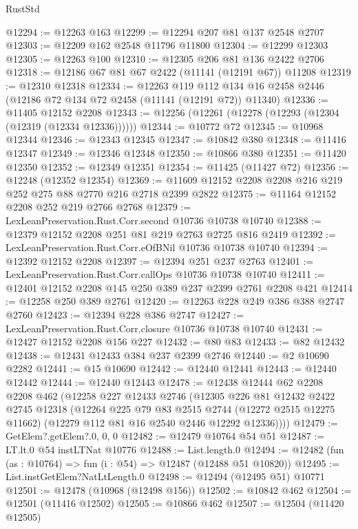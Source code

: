 \begin{lexlean}{RustStd}
\begin{coremodule}
@12294 := @12263 @163
@12299 := @12294 @207 @81 @137 @2548 @2707
@12303 := @12209 @162 @2548 @11796 @11800
@12304 := @12299 @12303
@12305 := @12263 @100
@12310 := @12305 @206 @81 @136 @2422 @2706
@12318 := @12186 @67 @81 @67 @2422 (@11141 (@12191 @67)) @11208
@12319 := @12310 @12318
@12334 := @12263
    @119
    @112
    @134
    @16
    @2458
    @2446
    (@12186 @72 @134 @72 @2458 (@11141 (@12191 @72)) @11340)
@12336 := @11405 @12152 @2208
@12343 := @12256 (@12261 (@12278 (@12293 (@12304 (@12319 (@12334 @12336))))))
@12344 := @10772 @72
@12345 := @10968 @12344
@12346 := @12343 @12345
@12347 := @10842 @380
@12348 := @11416 @12347
@12349 := @12346 @12348
@12350 := @10866 @380
@12351 := @11420 @12350
@12352 := @12349 @12351
@12354 := @11425 (@11427 @72)
@12356 := @12248 (@12352 @12354)
@12369 := @11609 @12152 @2208 @2208 @216 @219 @252 @275 @88 @2770 @216 @2718 @2399 @2822
@12375 := @11164 @12152 @2208 @252 @219 @2766 @2768
@12379 := LexLeanPreservation.Rust.Corr.second @10736 @10738 @10740
@12388 := @12379 @12152 @2208 @251 @81 @219 @2763 @2725 @816 @2419
@12392 := LexLeanPreservation.Rust.Corr.eOfBNil @10736 @10738 @10740
@12394 := @12392 @12152 @2208
@12397 := @12394 @251 @237 @2763
@12401 := LexLeanPreservation.Rust.Corr.callOps @10736 @10738 @10740
@12411 := @12401 @12152 @2208 @145 @250 @389 @237 @2399 @2761 @2208 @421
@12414 := @12258 @250 @389 @2761
@12420 := @12263 @228 @249 @386 @388 @2747 @2760
@12423 := @12394 @228 @386 @2747
@12427 := LexLeanPreservation.Rust.Corr.closure @10736 @10738 @10740
@12431 := @12427 @12152 @2208 @156 @227
@12432 := @80 @83
@12433 := @82 @12432
@12438 := @12431 @12433 @384 @237 @2399 @2746
@12440 := @2 @10690 @2282
@12441 := @15 @10690
@12442 := @12440 @12441
@12443 := @12440 @12442
@12444 := @12440 @12443
@12478 := @12438
    @12444
    @62
    @2208
    @2208
    @462
    (@12258
      @227
      @12433
      @2746
      (@12305
        @226
        @81
        @12432
        @2422
        @2745
        @12318
        (@12264
          @225
          @79
          @83
          @2515
          @2744
          (@12272 @2515 @12275 @11662)
          (@12279 @112 @81 @16 @2540 @2446 @12292 @12336))))
@12479 := GetElem?.getElem?.{0, 0, 0}
@12482 := @12479 @10764 @54 @51
@12487 := LT.lt.{0} @54 instLTNat @10776
@12488 := List.length.{0}
@12494 := @12482 (fun (as : @10764) => fun (i : @54) => @12487 (@12488 @51 @10820))
@12495 := List.instGetElem?NatLtLength.{0}
@12498 := @12494 (@12495 @51) @10771
@12501 := @12478 (@10968 (@12498 @156))
@12502 := @10842 @462
@12504 := @12501 (@11416 @12502)
@12505 := @10866 @462
@12507 := @12504 (@11420 @12505)

\end{coremodule}
\end{lexlean}
